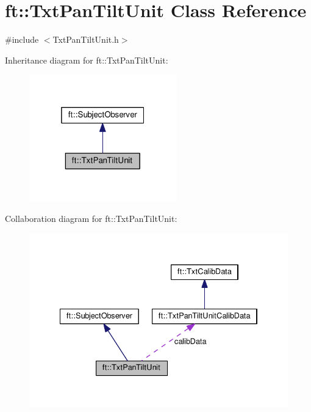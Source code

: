 \hypertarget{classft_1_1_txt_pan_tilt_unit}{}\section{ft\+:\+:Txt\+Pan\+Tilt\+Unit Class Reference}
\label{classft_1_1_txt_pan_tilt_unit}


{\ttfamily \#include $<$Txt\+Pan\+Tilt\+Unit.\+h$>$}



Inheritance diagram for ft\+:\+:Txt\+Pan\+Tilt\+Unit\+:
\nopagebreak
\begin{figure}[H]
\begin{center}
\leavevmode
\includegraphics[width=181pt]{classft_1_1_txt_pan_tilt_unit__inherit__graph}
\end{center}
\end{figure}


Collaboration diagram for ft\+:\+:Txt\+Pan\+Tilt\+Unit\+:
\nopagebreak
\begin{figure}[H]
\begin{center}
\leavevmode
\includegraphics[width=334pt]{classft_1_1_txt_pan_tilt_unit__coll__graph}
\end{center}
\end{figure}
